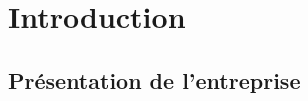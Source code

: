 \documentclass[12pt]{report}
\begin{document}


\newpage


\tableofcontents

\newpage

\chapter{Introduction}
\section{Présentation de l'entreprise}
\end{document}
